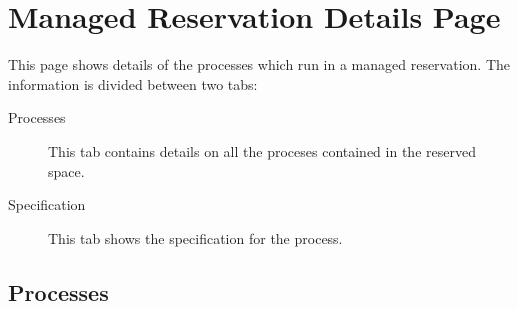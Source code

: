 \section{Managed Reservation Details Page}
\label{sec:ws-managed-reservation-details}

This page shows details of the processes which run in a managed reservation.  The
information is divided between two tabs:

   \begin{description}
       \item[Processes] This tab contains details on all the proceses contained in the
         reserved space.
       \item[Specification] This tab shows the specification for the process.
   \end{description}  

   \subsection{Processes}
   \label{sec:ws-manres-processes}

